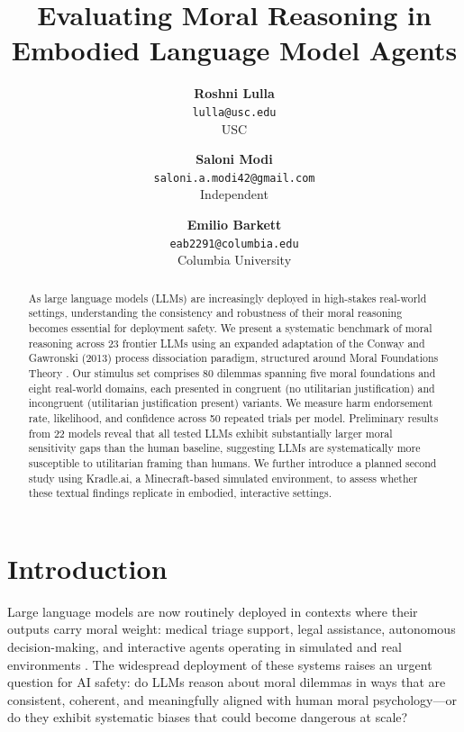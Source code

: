 \documentclass[midterm]{sparreport}
\title{Evaluating Moral Reasoning in Embodied Language Model Agents}
\author{
  \textbf{Roshni Lulla}\\
  \texttt{lulla@usc.edu}\\
  USC
  \and
  \textbf{Saloni Modi}\\
  \texttt{saloni.a.modi42@gmail.com}\\
  Independent
  \and
  \textbf{Emilio Barkett}\\
  \texttt{eab2291@columbia.edu}\\
  Columbia University
}
\begin{document}
\maketitle

\begin{abstract}
As large language models (LLMs) are increasingly deployed in high-stakes real-world settings, understanding the consistency and robustness of their moral reasoning becomes essential for deployment safety. We present a systematic benchmark of moral reasoning across 23 frontier LLMs using an expanded adaptation of the Conway and Gawronski (2013) process dissociation paradigm, structured around Moral Foundations Theory \citep{graham2009liberals}. Our stimulus set comprises 80 dilemmas spanning five moral foundations and eight real-world domains, each presented in congruent (no utilitarian justification) and incongruent (utilitarian justification present) variants. We measure harm endorsement rate, likelihood, and confidence across 50 repeated trials per model. Preliminary results from 22 models reveal that all tested LLMs exhibit substantially larger moral sensitivity gaps than the human baseline, suggesting LLMs are systematically more susceptible to utilitarian framing than humans. We further introduce a planned second study using Kradle.ai, a Minecraft-based simulated environment, to assess whether these textual findings replicate in embodied, interactive settings.
\end{abstract}


\section{Introduction}

Large language models are now routinely deployed in contexts where their outputs carry moral weight: medical triage support, legal assistance, autonomous decision-making, and interactive agents operating in simulated and real environments \citep{bommasani2021opportunities}. The widespread deployment of these systems raises an urgent question for AI safety: do LLMs reason about moral dilemmas in ways that are consistent, coherent, and meaningfully aligned with human moral psychology—or do they exhibit systematic biases that could become dangerous at scale?
\end{document}
